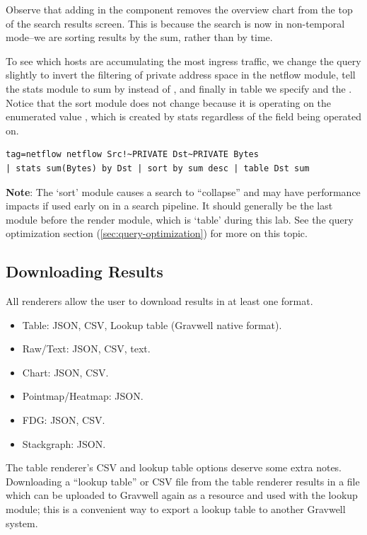 Observe that adding in the  component removes the
overview chart from the top of the search results screen. This is
because the search is now in non-temporal mode--we are sorting results by
the sum, rather than by time.

To see which hosts are accumulating the most ingress traffic, we change
the query slightly to invert the filtering of private address space in
the netflow module, tell the stats module to sum by  instead of ,
and finally in table we specify  and the . Notice that the sort
module does not change because it is operating on the enumerated value
, which is created by stats regardless of the field being operated
on.

\begin{Verbatim}[breaklines=true]
tag=netflow netflow Src!~PRIVATE Dst~PRIVATE Bytes
| stats sum(Bytes) by Dst | sort by sum desc | table Dst sum
\end{Verbatim}

\textbf{Note}: The `sort' module causes a search to ``collapse'' and may have
performance impacts if used early on in a search pipeline. It should
generally be the last module before the render module, which is `table'
during this lab. See the query optimization section (\ref{sec:query-optimization}) for more on this topic.



\subsection{Downloading Results}

All renderers allow the user to download results in at least one
format.

\begin{itemize}
\item
  Table: JSON, CSV, Lookup table (Gravwell native format).
\item
  Raw/Text: JSON, CSV, text.
\item
  Chart: JSON, CSV.
\item
  Pointmap/Heatmap: JSON.
\item
  FDG: JSON, CSV.
\item
  Stackgraph: JSON.
\end{itemize}

The table renderer's CSV and lookup table options deserve some extra notes.
Downloading a ``lookup table'' or CSV file
from the table renderer results in a file which can be uploaded to
Gravwell again as a resource and used with the lookup module; this is a
convenient way to export a lookup table to another Gravwell system.


